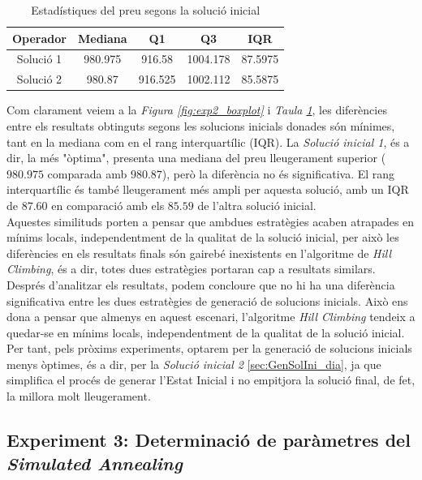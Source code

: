 \documentclass[a4paper]{article}
\begin{document}
	\begin{table}[H]
		\centering
		\begin{tabular}{|c|c|c|c|c|}
			\hline
			\textbf{Operador} & \textbf{Mediana} & \textbf{Q1} & \textbf{Q3} & \textbf{IQR} \\
			\hline
			Solució 1 & 980.975 & 916.58 & 1004.178 & 87.5975 \\
			\hline
			Solució 2 & 980.87 & 916.525 & 1002.112 & 85.5875 \\
			\hline
		\end{tabular}
		\caption{Estadístiques del preu segons la solució inicial}
		\label{tab:exp2_estadisticas}
	\end{table}
	
	Com clarament veiem a la \textit{Figura \ref{fig:exp2_boxplot}} i \textit{Taula \ref{tab:exp2_estadisticas}}, les diferències entre els resultats obtinguts segons les solucions inicials donades són mínimes, tant en la mediana com en el rang interquartílic (IQR). La \textit{Solució inicial 1}, és a dir, la més "òptima", presenta una mediana del preu lleugerament superior ($980.975$ comparada amb $980.87$), però la diferència no és significativa. El rang interquartílic és també lleugerament més ampli per aquesta solució, amb un IQR de $87.60$ en comparació amb els $85.59$ de l'altra solució inicial.\\
	
	Aquestes similituds porten a pensar que ambdues estratègies acaben atrapades en mínims locals, independentment de la qualitat de la solució inicial, per això les diferències en els resultats finals són gairebé inexistents en l'algoritme de \textit{Hill Climbing}, és a dir, totes dues estratègies portaran cap a resultats similars.\\
	
	Després d'analitzar els resultats, podem concloure que no hi ha una diferència significativa entre les dues estratègies de generació de solucions inicials. Això ens dona a pensar que almenys en aquest escenari, l'algoritme \textit{Hill Climbing} tendeix a quedar-se en mínims locals, independentment de la qualitat de la solució inicial. Per tant, pels pròxims experiments, optarem per la generació de solucions inicials menys òptimes, és a dir, per la \textit{Solució inicial 2} \ref{sec:GenSolIni_dia}, ja que simplifica el procés de generar l'Estat Inicial i no empitjora la solució final, de fet, la millora molt lleugerament.
	
	\subsection{Experiment 3: Determinació de paràmetres del \textit{Simulated Annealing}}
	\label{sec:exp3}
\end{document}
